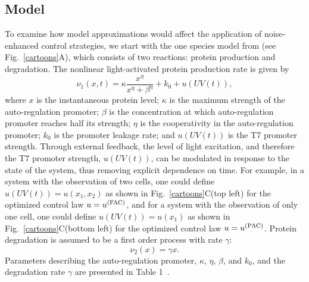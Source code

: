 \documentclass[12pt]{article}
\begin{document}
\subsection{Model}
To examine how model approximations would affect the application of noise-enhanced control strategies, we start with the one species model from \cite{May2021} (see Fig.\ \ref{cartoons}A), which consists of two reactions: protein production and degradation.  The nonlinear light-activated protein production rate is given by
 \begin{equation}
\nu_1(x,t)= \kappa\frac{x^\eta}{x^\eta+\beta^\eta}+ k_0 + u(UV(t)),
\label{prodRate}
\end{equation}
%
%
where $x$ is the instantaneous protein level; $\kappa$ is the maximum strength of the auto-regulation promoter; $\beta$ is the concentration at which auto-regulation promoter reaches half its strength; $\eta$ is the cooperativity in the auto-regulation promoter; $k_0$ is the promoter leakage rate; and $u(UV(t))$ is the T7 promoter strength. Through external feedback, the level of light excitation, and therefore the T7 promoter strength, $u(UV(t))$, can be modulated in response to the state of the system, thus removing explicit dependence on time. For example, in a system with the observation of two cells, one could define $u(UV(t)) = u(x_1,x_2)$ as shown in Fig.\ \ref{cartoons}C(top left) for the optimized control law $u=u^{\rm (FAC)}$, and for a system with the observation of only one cell, one could define $u(UV(t)) = u(x_1)$ as shown in Fig.\ \ref{cartoons}C(bottom left) for the optimized control law $u=u^{\rm (PAC)}$. Protein degradation is assumed to be a first order process with rate $\gamma$:
\begin{equation}
\nu_2(x) = \gamma x.
\end{equation}
Parameters describing the auto-regulation promoter, $\kappa$, $\eta$, $\beta$, and $k_0$, and the degradation rate $\gamma$
are presented in Table 1~\cite{May2021}. 
\end{document}
